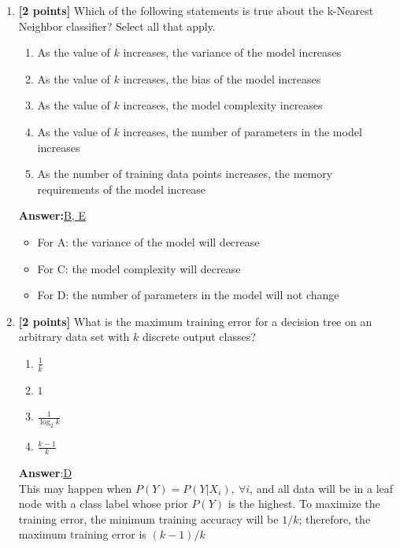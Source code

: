 \begin{enumerate}
	\item {\textbf{[2 points]} Which of the following statements is true about the k-Nearest Neighbor classifier? Select all that apply.
		\begin{enumerate}[label=\Alph*)]
			\item{ As the value of $k$ increases, the variance of the model increases }
			\item{ As the value of $k$ increases, the bias of the model increases }
			\item{ As the value of $k$ increases, the model complexity increases }
			\item{ As the value of $k$ increases, the number of parameters in the model increases }
			\item{ As the number of training data points increases, the memory requirements of the model increase }
		\end{enumerate}
	}
	\textbf{Answer:}\underline{B, E}\\
	\begin{itemize}
		\item For A: the variance of the model will decrease
		\item For C: the model complexity will decrease
		\item For D: the number of parameters in the model will not change
	\end{itemize}
	
	
	\item {\textbf{[2 points]} What is the maximum training error for a decision tree on an arbitrary data set with $k$ discrete output classes?
	
		\begin{enumerate}[label=\Alph*)]
			\item $\frac{1}{k}$
			\item $1$
			\item $\frac{1}{\log_2{k}}$
			\item $\frac{k - 1}{k}$
		\end{enumerate}
	
	}
	\textbf{Answer}:\underline{D}\\
	This may happen when $P(Y)=P(Y|X_i),~\forall i$, and all data will be in a leaf node with a class label whose prior $P(Y)$ is the highest. To maximize the training error, the minimum training accuracy will be $1/k$; therefore, the maximum training error is $(k-1)/k$
	

\end{enumerate}
